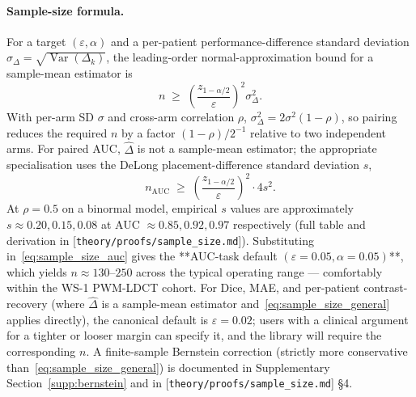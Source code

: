 \documentclass[twoside,11pt]{article}
\begin{document}
\paragraph{Sample-size formula.} For a target $(\varepsilon, \alpha)$ and a per-patient performance-difference standard deviation $\sigma_\Delta = \sqrt{\operatorname{Var}(\Delta_k)}$, the leading-order normal-approximation bound for a sample-mean estimator is
\begin{equation}
    n \;\geq\; \left(\frac{z_{1-\alpha/2}}{\varepsilon}\right)^{\!2} \sigma_\Delta^2.
    \label{eq:sample_size_general}
\end{equation}
With per-arm SD $\sigma$ and cross-arm correlation $\rho$, $\sigma_\Delta^2 = 2 \sigma^2 (1 - \rho)$, so pairing reduces the required $n$ by a factor $(1-\rho)/2^{-1}$ relative to two independent arms. For paired AUC, $\hat\Delta$ is not a sample-mean estimator; the appropriate specialisation uses the DeLong placement-difference standard deviation $s$,
\begin{equation}
    n_{\text{AUC}} \;\geq\; \left(\frac{z_{1-\alpha/2}}{\varepsilon}\right)^{\!2} \cdot 4 s^2.
    \label{eq:sample_size_auc}
\end{equation}
At $\rho = 0.5$ on a binormal model, empirical $s$ values are approximately $s \approx 0.20, 0.15, 0.08$ at AUC $\approx 0.85, 0.92, 0.97$ respectively (full table and derivation in [\texttt{theory/proofs/sample\_size.md}]). Substituting in~\eqref{eq:sample_size_auc} gives the **AUC-task default $(\varepsilon = 0.05, \alpha = 0.05)$**, which yields $n \approx 130$--$250$ across the typical operating range --- comfortably within the WS-1 PWM-LDCT cohort. For Dice, MAE, and per-patient contrast-recovery (where $\hat\Delta$ is a sample-mean estimator and~\eqref{eq:sample_size_general} applies directly), the canonical default is $\varepsilon = 0.02$; users with a clinical argument for a tighter or looser margin can specify it, and the library will require the corresponding $n$. A finite-sample Bernstein correction (strictly more conservative than~\eqref{eq:sample_size_general}) is documented in Supplementary Section~\ref{supp:bernstein} and in [\texttt{theory/proofs/sample\_size.md}] §4.
\end{document}
